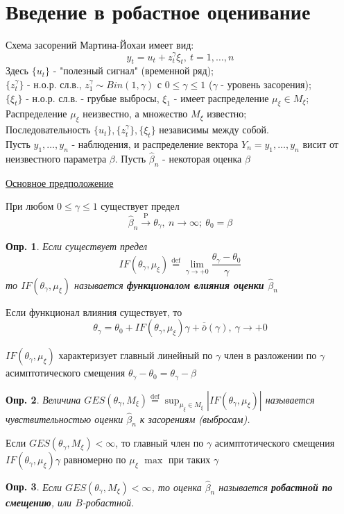 \documentclass[12pt]{article}
\newtheorem{definition}{Опр.}
\theoremstyle{basic_theorem}
\theoremstyle{name_theorem}
\newcommand\defin[1]{\textbf{#1}}
\newcommand*{\defeq}{\stackrel{\text{def}}{=}}
\def\P{ \mathrm{P} }
\def\littleO{ \overline{\overline{o}} }
\begin{document}
    \section{Введение в робастное оценивание}

    Схема засорений Мартина-Йохаи имеет вид:
    \[y_t = u_t + z^\gamma_t\xi_t,\ t = 1, \ldots, n\]
    Здесь $\{u_t\}$ - "полезный сигнал" (временной ряд); \\
    $\{z_t^\gamma\}$ - н.о.р. сл.в., $z_1^{\gamma} \sim Bin(1, \gamma)$
    с $0 \leq \gamma\leq1$ ($\gamma$ - уровень засорения); \\
    $\{\xi_t\}$ - н.о.р. сл.в. - грубые выбросы, $\xi_1$ - имеет распределение
    $\mu_\xi\in M_\xi$;
    Распределение $\mu_\xi$ неизвестно, а множество $M_\xi$ известно; \\
    Последовательность $\{u_t\}, \{z^\gamma_t\}, \{\xi_t\}$ независимы между собой. \\
    Пусть $y_1, \ldots, y_n$ - наблюдения, и распределение
    вектора $Y_n=y_1, \ldots, y_n$ висит от неизвестного параметра $\beta$.
    Пусть $\hat{\beta}_n$ - некоторая оценка $\beta$

    \underline{Основное предположение}

    При любом $0 \leq \gamma\leq1$ существует предел
    \[\hat{\beta}_n\xrightarrow{\P}\theta_\gamma,\ n\rightarrow\infty;\ \theta_0=\beta\]

    \begin{definition}
        Если существует предел
        \[IF(\theta_\gamma, \mu_\xi)\defeq\lim_{\gamma\rightarrow+0}\frac{\theta_\gamma-\theta_0}{\gamma}\]
        то $IF(\theta_\gamma, \mu_\xi)$ называется \defin{функционалом влияния оценки $\widehat{\beta}_n$}
    \end{definition}

    Если функционал влияния существует, то 
    \[\theta_\gamma = \theta_0 + IF(\theta_\gamma, \mu_\xi)\gamma + \littleO(\gamma),\ \gamma\rightarrow+0\]
    \begin{leftbar}
       $IF(\theta_\gamma, \mu_\xi)$ характеризует главный линейный по
        $\gamma$ член в разложении по $\gamma$ асимптотического смещения $\theta_\gamma - \theta_0=\theta_\gamma-\beta$
    \end{leftbar}

    \begin{definition}
        Величина $GES(\theta_\gamma,M_\xi)\defeq\sup_{\mu_\xi\in M_\xi}\left\lvert IF(\theta_\gamma, \mu_\xi)\right\rvert$
        называется чувствительностью оценки $\widehat{\beta}_n$ к засорениям (выбросам).
    \end{definition}
    \begin{leftbar}
        Если $GES(\theta_\gamma,M_\xi)<\infty$, то главный член по $\gamma$
        асимптотического смещения $IF(\theta_\gamma,\mu_\xi)\gamma$
        равномерно по $\mu_\xi$ $\max$ при таких $\gamma$
    \end{leftbar}
    \begin{definition}
        Если $GES(\theta_\gamma,M_\xi)<\infty$, то оценка $\widehat{\beta}_n$
        называется \defin{робастной по смещению}, или $B$-робастной.
    \end{definition}
\end{document}
